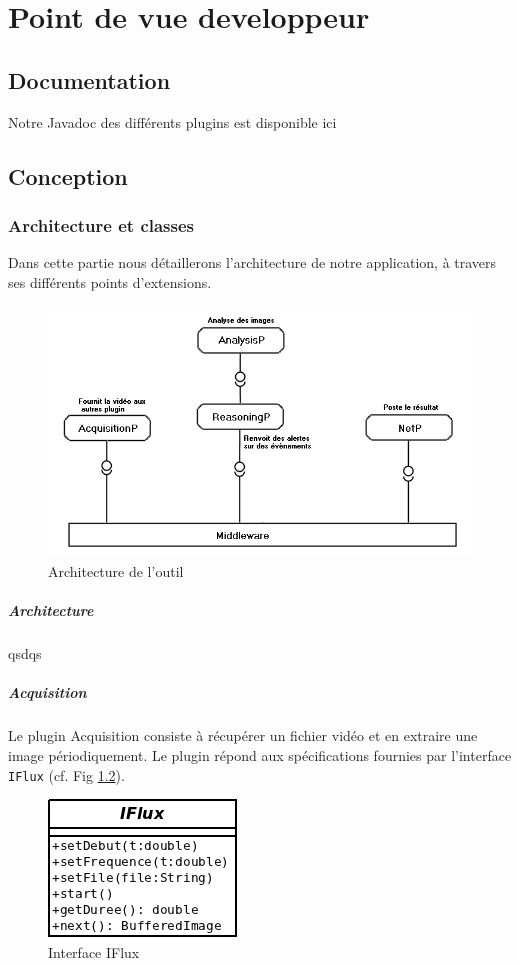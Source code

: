 \chapter{Point de vue developpeur}

\section{Documentation}
Notre Javadoc des différents plugins est disponible ici \cite{doc}
\clearpage

\section{Conception}
	\subsection{Architecture et classes}
	Dans cette partie nous détaillerons l'architecture de notre application, à travers ses différents points d'extensions.
	\begin{figure}[!htbp]
	  \centering
	  \includegraphics[scale=0.50]{img/archi}
	  \caption{Architecture de l'outil}
	  \label{fig:archi}
	\end{figure}


		\paragraph{Architecture}
		qsdqs
		\paragraph{Acquisition}
		Le plugin Acquisition consiste à récupérer un fichier vidéo et en extraire une image périodiquement. Le plugin répond aux spécifications fournies par l'interface \verb+IFlux+ (cf. Fig \ref{fig:IFlux}).
		\begin{figure}[htbp]
			\centering
			\includegraphics[scale=0.50]{img/IFlux}
			\caption{Interface IFlux}
			\label{fig:IFlux}
		\end{figure}


